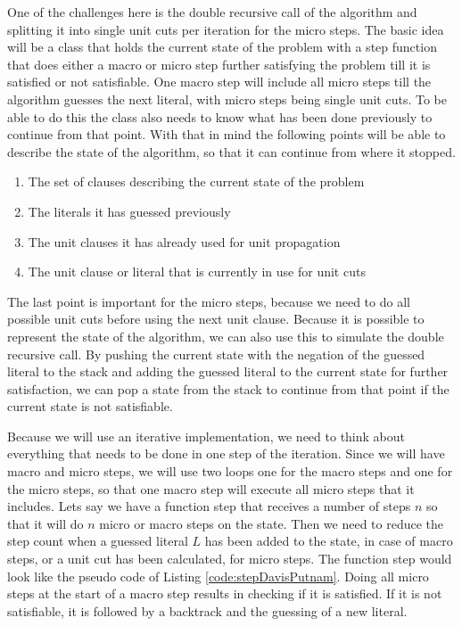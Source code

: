 One of the challenges here is the double recursive call of the algorithm and splitting it into single unit cuts per iteration for the micro steps. The basic idea will be a class that holds the current state of the problem with a step function that does either a macro or micro step further satisfying the problem till it is satisfied or not satisfiable. One macro step will include all micro steps till the algorithm guesses the next literal, with micro steps being single unit cuts. To be able to do this the class also needs to know what has been done previously to continue from that point. With that in mind the following points will be able to describe the state of the algorithm, so that it can continue from where it stopped.

\begin{enumerate}
    \item The set of clauses describing the current state of the problem
    \item The literals it has guessed previously
    \item The unit clauses it has already used for unit propagation
    \item The unit clause or literal that is currently in use for unit cuts
\end{enumerate}

The last point is important for the micro steps, because we need to do all possible unit cuts before using the next unit clause. Because it is possible to represent the state of the algorithm, we can also use this to simulate the double recursive call. By pushing the current state with the negation of the guessed literal to the stack and adding the guessed literal to the current state for further satisfaction, we can pop a state from the stack to continue from that point if the current state is not satisfiable.

Because we will use an iterative implementation, we need to think about everything that needs to be done in one step of the iteration. Since we will have macro and micro steps, we will use two loops one for the macro steps and one for the micro steps, so that one macro step will execute all micro steps that it includes. Lets say we have a function step that receives a number of steps $n$ so that it will do $n$ micro or macro steps on the state. Then we need to reduce the step count when a guessed literal $L$ has been added to the state, in case of macro steps, or a unit cut has been calculated, for micro steps. The function step would look like the pseudo code of Listing \ref{code:stepDavisPutnam}. Doing all micro steps at the start of a macro step results in checking if it is satisfied. If it is not satisfiable, it is followed by a backtrack and the guessing of a new literal.

